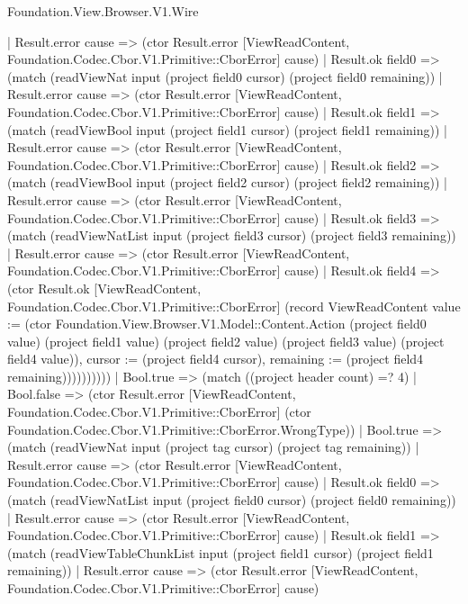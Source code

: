 \begin{lexlean}{Foundation.View.Browser.V1.Wire}
\begin{semanticmodule}
{                    | Result.error cause => (ctor Result.error [ViewReadContent, Foundation.Codec.Cbor.V1.Primitive::CborError] cause)
                    | Result.ok field0 => (match (readViewNat input (project field0 cursor) (project field0 remaining))
                      | Result.error cause => (ctor Result.error [ViewReadContent, Foundation.Codec.Cbor.V1.Primitive::CborError] cause)
                      | Result.ok field1 => (match (readViewBool input (project field1 cursor) (project field1 remaining))
                        | Result.error cause => (ctor Result.error [ViewReadContent, Foundation.Codec.Cbor.V1.Primitive::CborError] cause)
                        | Result.ok field2 => (match (readViewBool input (project field2 cursor) (project field2 remaining))
                          | Result.error cause => (ctor Result.error [ViewReadContent, Foundation.Codec.Cbor.V1.Primitive::CborError] cause)
                          | Result.ok field3 => (match (readViewNatList input (project field3 cursor) (project field3 remaining))
                            | Result.error cause => (ctor Result.error [ViewReadContent, Foundation.Codec.Cbor.V1.Primitive::CborError] cause)
                            | Result.ok field4 => (ctor Result.ok [ViewReadContent, Foundation.Codec.Cbor.V1.Primitive::CborError] (record ViewReadContent {value := (ctor Foundation.View.Browser.V1.Model::Content.Action (project field0 value) (project field1 value) (project field2 value) (project field3 value) (project field4 value)), cursor := (project field4 cursor), remaining := (project field4 remaining)})))))))))
              | Bool.true => (match ((project header count) =? 4)
                | Bool.false => (ctor Result.error [ViewReadContent, Foundation.Codec.Cbor.V1.Primitive::CborError] (ctor Foundation.Codec.Cbor.V1.Primitive::CborError.WrongType))
                | Bool.true => (match (readViewNat input (project tag cursor) (project tag remaining))
                  | Result.error cause => (ctor Result.error [ViewReadContent, Foundation.Codec.Cbor.V1.Primitive::CborError] cause)
                  | Result.ok field0 => (match (readViewNatList input (project field0 cursor) (project field0 remaining))
                    | Result.error cause => (ctor Result.error [ViewReadContent, Foundation.Codec.Cbor.V1.Primitive::CborError] cause)
                    | Result.ok field1 => (match (readViewTableChunkList input (project field1 cursor) (project field1 remaining))
                      | Result.error cause => (ctor Result.error [ViewReadContent, Foundation.Codec.Cbor.V1.Primitive::CborError] cause)
}
\end{semanticmodule}
\end{lexlean}
